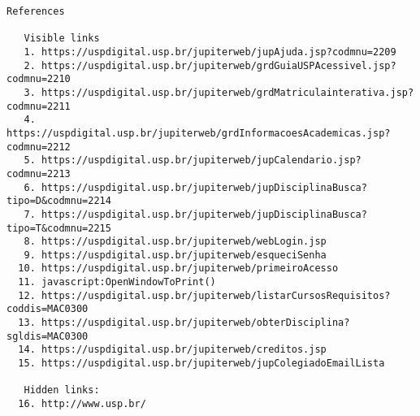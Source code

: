 \documentclass[brazil]{article}
\begin{document}
\begin{small}
\begin{verbatim}
References

   Visible links
   1. https://uspdigital.usp.br/jupiterweb/jupAjuda.jsp?codmnu=2209
   2. https://uspdigital.usp.br/jupiterweb/grdGuiaUSPAcessivel.jsp?codmnu=2210
   3. https://uspdigital.usp.br/jupiterweb/grdMatriculainterativa.jsp?codmnu=2211
   4. https://uspdigital.usp.br/jupiterweb/grdInformacoesAcademicas.jsp?codmnu=2212
   5. https://uspdigital.usp.br/jupiterweb/jupCalendario.jsp?codmnu=2213
   6. https://uspdigital.usp.br/jupiterweb/jupDisciplinaBusca?tipo=D&codmnu=2214
   7. https://uspdigital.usp.br/jupiterweb/jupDisciplinaBusca?tipo=T&codmnu=2215
   8. https://uspdigital.usp.br/jupiterweb/webLogin.jsp
   9. https://uspdigital.usp.br/jupiterweb/esqueciSenha
  10. https://uspdigital.usp.br/jupiterweb/primeiroAcesso
  11. javascript:OpenWindowToPrint()
  12. https://uspdigital.usp.br/jupiterweb/listarCursosRequisitos?coddis=MAC0300
  13. https://uspdigital.usp.br/jupiterweb/obterDisciplina?sgldis=MAC0300
  14. https://uspdigital.usp.br/jupiterweb/creditos.jsp
  15. https://uspdigital.usp.br/jupiterweb/jupColegiadoEmailLista

   Hidden links:
  16. http://www.usp.br/
\end{verbatim}
\end{small}
\end{document}
